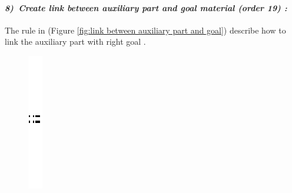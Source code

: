 \paragraph{\emph{8)~Create link between auxiliary part and  goal material  (order 19) :} }
 
 
The rule in (Figure \ref{fig:link between auxiliary part and goal})  describe 
how to link the auxiliary part with right goal .  


\begin{figure}[th]
\centering

	\quad{}\quad{}
		\includegraphics{Chapiter3/img/sep}
	\quad{}\quad{}
  

\end{figure}
